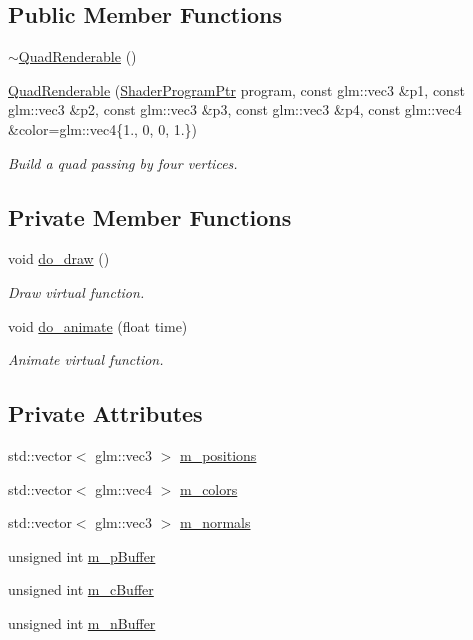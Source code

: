 \subsection*{Public Member Functions}
\begin{DoxyCompactItemize}
\item 
\hyperlink{classQuadRenderable_a188666a23247f2b8c37642f25856dc7f}{$\sim$\+Quad\+Renderable} ()
\item 
\hyperlink{classQuadRenderable_a3c4fc3b8118d06fc7e2457e76f2bc48a}{Quad\+Renderable} (\hyperlink{ShaderProgram_8hpp_af8e4af1ad4c53875ee5d32ab7e1f4966}{Shader\+Program\+Ptr} program, const glm\+::vec3 \&p1, const glm\+::vec3 \&p2, const glm\+::vec3 \&p3, const glm\+::vec3 \&p4, const glm\+::vec4 \&color=glm\+::vec4\{1., 0, 0, 1.\})
\begin{DoxyCompactList}\small\item\em Build a quad passing by four vertices. \end{DoxyCompactList}\end{DoxyCompactItemize}
\subsection*{Private Member Functions}
\begin{DoxyCompactItemize}
\item 
void \hyperlink{classQuadRenderable_a584444dfbbb34ef5a6fac48a72aa51e6}{do\+\_\+draw} ()
\begin{DoxyCompactList}\small\item\em Draw virtual function. \end{DoxyCompactList}\item 
void \hyperlink{classQuadRenderable_a19fc1c1704e35cd89c31997e898fb9ba}{do\+\_\+animate} (float time)
\begin{DoxyCompactList}\small\item\em Animate virtual function. \end{DoxyCompactList}\end{DoxyCompactItemize}
\subsection*{Private Attributes}
\begin{DoxyCompactItemize}
\item 
std\+::vector$<$ glm\+::vec3 $>$ \hyperlink{classQuadRenderable_a98895c29eb360bfa5399856fd05808a3}{m\+\_\+positions}
\item 
std\+::vector$<$ glm\+::vec4 $>$ \hyperlink{classQuadRenderable_a775824ad790972ac1fb82553ce2d9268}{m\+\_\+colors}
\item 
std\+::vector$<$ glm\+::vec3 $>$ \hyperlink{classQuadRenderable_a6af0484f27f593537f05c7eb8386bd09}{m\+\_\+normals}
\item 
unsigned int \hyperlink{classQuadRenderable_a985335081fe25dd9556d86d6d168b5fe}{m\+\_\+p\+Buffer}
\item 
unsigned int \hyperlink{classQuadRenderable_af276accada410c35db3feb1456e6da15}{m\+\_\+c\+Buffer}
\item 
unsigned int \hyperlink{classQuadRenderable_aa812c4e6491db1ac7e464f5b3dc8561a}{m\+\_\+n\+Buffer}
\end{DoxyCompactItemize}
